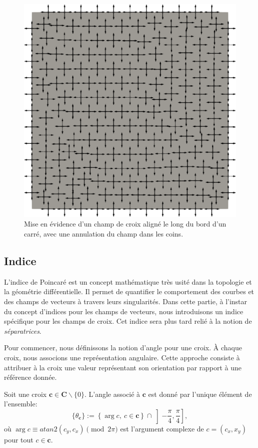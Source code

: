\begin{figure}[h!]
  \centering
  \includegraphics[scale=0.32]{images/align_bord.pdf}
  \caption{Mise en évidence d'un champ de croix aligné le long du bord d'un carré, avec une annulation du champ dans les coins.}
  \label{fig:align_bord}
\end{figure}

\subsection{Indice}

L'indice de Poincaré est un concept mathématique très usité dans la topologie et la géométrie différentielle. Il permet de quantifier le comportement des courbes et des champs de vecteurs à travers leurs singularités. Dans cette partie, à l'instar du concept d'indices pour les champs de vecteurs, nous introduisons un indice spécifique pour les champs de croix. Cet indice sera plus tard relié à la notion de \emph{séparatrices}.

Pour commencer, nous définissons la notion d'angle pour une croix. À chaque croix, nous associons une représentation angulaire. Cette approche consiste à attribuer à la croix une valeur représentant son orientation par rapport à une référence donnée.

\begin{definition}
    \label{def:cross_angle}
    Soit une croix $\mathbf{c}\in\mathbf{C}\backslash\{0\}$. L'angle associé à $\mathbf{c}$ est donné par l'unique élément de l'ensemble:
    $$\{\theta_{\mathbf{c}}\} := \left\{\arg c,~c\in \mathbf{c}\right\} \cap \left]-\frac{\pi}{4},\frac{\pi}{4}\right],$$
    où $\arg c\equiv atan2(c_y, c_x)\pmod{2\pi}$ est l'argument complexe de $c=(c_x, x_y)$ pour tout $c\in\mathbf{c}$.
\end{definition}

